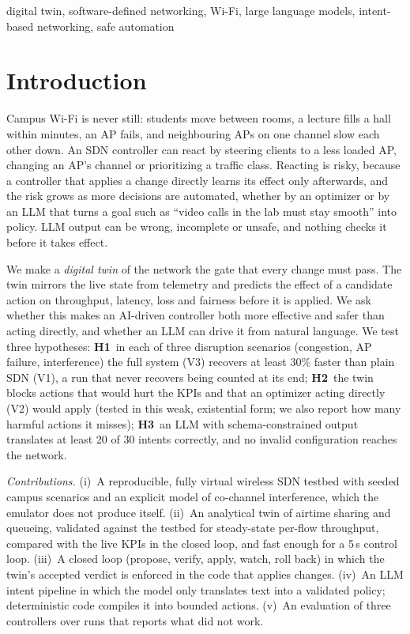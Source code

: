 \documentclass[conference]{IEEEtran}
\begin{document}
\begin{IEEEkeywords}
digital twin, software-defined networking, Wi-Fi, large language models, intent-based networking, safe automation
\end{IEEEkeywords}

\section{Introduction}
Campus Wi-Fi is never still: students move between rooms, a lecture fills a hall within minutes, an AP fails, and neighbouring APs on one channel slow each other down. An SDN controller can react by steering clients to a less loaded AP, changing an AP's channel or prioritizing a traffic class. Reacting is risky, because a controller that applies a change directly learns its effect only afterwards, and the risk grows as more decisions are automated, whether by an optimizer or by an LLM that turns a goal such as ``video calls in the lab must stay smooth'' into policy. LLM output can be wrong, incomplete or unsafe, and nothing checks it before it takes effect.

We make a \emph{digital twin} of the network the gate that every change must pass. The twin mirrors the live state from telemetry and predicts the effect of a candidate action on throughput, latency, loss and fairness before it is applied. We ask whether this makes an AI-driven controller both more effective and safer than acting directly, and whether an LLM can drive it from natural language. We test three hypotheses:
\textbf{H1}~in each of three disruption scenarios (congestion, AP failure, interference) the full system (V3) recovers at least 30\% faster than plain SDN (V1), a run that never recovers being counted at its end;
\textbf{H2}~the twin blocks actions that would hurt the KPIs and that an optimizer acting directly (V2) would apply (tested in this weak, existential form; we also report how many harmful actions it misses);
\textbf{H3}~an LLM with schema-constrained output translates at least 20 of 30 intents correctly, and no invalid configuration reaches the network.

\emph{Contributions.}
(i)~A reproducible, fully virtual wireless SDN testbed with seeded campus scenarios and an explicit model of co-channel interference, which the emulator does not produce itself.
(ii)~An analytical twin of airtime sharing and queueing, validated against the testbed for steady-state per-flow throughput, compared with the live KPIs in the closed loop, and fast enough for a 5\,s control loop.
(iii)~A closed loop (propose, verify, apply, watch, roll back) in which the twin's accepted verdict is enforced in the code that applies changes.
(iv)~An LLM intent pipeline in which the model only translates text into a validated policy; deterministic code compiles it into bounded actions.
(v)~An evaluation of three controllers over \NumRuns{} runs that reports what did not work.
\end{document}
